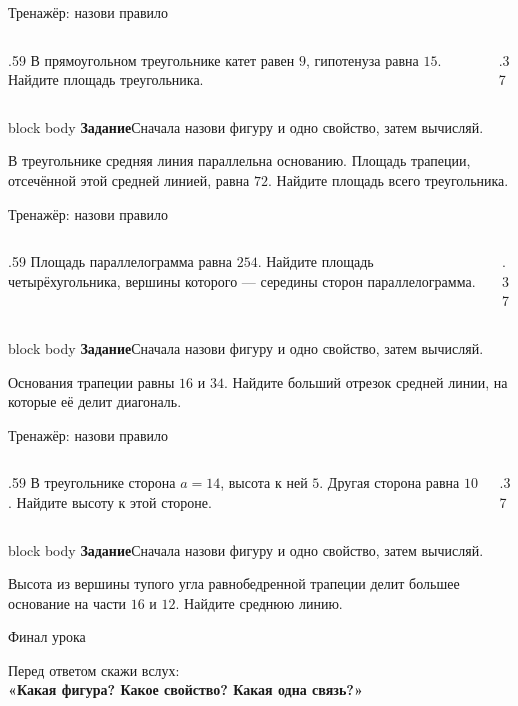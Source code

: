 \documentclass[aspectratio=169,12pt]{beamer}
\newcommand{\support}[2]{%
\vfill
\begin{beamercolorbox}[wd=\linewidth,sep=1.1ex,rounded=true,shadow=false]{block body}
\textbf{#1}\quad #2
\end{beamercolorbox}}
\newcommand{\trainerframe}[3]{%
\begin{frame}{Тренажёр: назови правило}
\begin{columns}[T,onlytextwidth]
\begin{column}{.59\textwidth}
\vspace{3mm}\Large #1
\end{column}
\begin{column}{.37\textwidth}
\centering\resizebox{\linewidth}{!}{#2}
\end{column}
\end{columns}
\support{Задание}{Сначала назови фигуру и одно свойство, затем вычисляй.}
\end{frame}}
\begin{document}
\trainerframe{В прямоугольном треугольнике катет равен \(9\), гипотенуза равна \(15\).
Найдите площадь треугольника.}{\figRightTriangle}

\trainerframe{В треугольнике средняя линия параллельна основанию. Площадь трапеции,
отсечённой этой средней линией, равна \(72\). Найдите площадь всего треугольника.}{\figMidlineTriangle}

\trainerframe{Площадь параллелограмма равна \(254\). Найдите площадь четырёхугольника,
вершины которого --- середины сторон параллелограмма.}{\figParallelogramMidpoints}

\trainerframe{Основания трапеции равны \(16\) и \(34\). Найдите больший отрезок средней
линии, на которые её делит диагональ.}{\figTrapezoidDiagonal}

\trainerframe{В треугольнике сторона \(a=14\), высота к ней \(5\). Другая сторона равна \(10\).
Найдите высоту к этой стороне.}{\figTriangleAltitudes}

\trainerframe{Высота из вершины тупого угла равнобедренной трапеции делит большее основание
на части \(16\) и \(12\). Найдите среднюю линию.}{\figIsoscelesTrapezoid}

\begin{frame}{Финал урока}
\begin{center}
\Large Перед ответом скажи вслух:\\[5mm]
\textcolor{lessonblue}{\textbf{«Какая фигура? Какое свойство? Какая одна связь?»}}
\end{center}
\end{frame}
\end{document}

